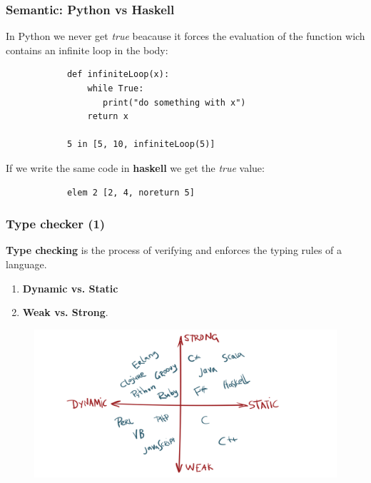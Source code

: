 \documentclass[xcolor ={table,usenames,dvipsnames}]{beamer}
\theoremstyle{definition}
\begin{document}
	\begin{frame}[fragile]
		\frametitle{Semantic: Python vs Haskell}
		In Python we never get \textit{true} beacause  it forces the evaluation of the function wich contains an infinite loop in the body:
		\begin{lstlisting}
			def infiniteLoop(x):
			    while True:
		           print("do something with x")
		        return x
				
			5 in [5, 10, infiniteLoop(5)]
		\end{lstlisting}
		If we write the same code in \textbf{haskell} we get the \textit{true} value:
		\begin{lstlisting}
			elem 2 [2, 4, noreturn 5]
		\end{lstlisting}
	\end{frame}

	\begin{frame}
		\frametitle{Type checker (1)}
			\textbf{Type checking} is the process of verifying and enforces the typing rules of a language.
		\begin{enumerate}
			\item \textbf{Dynamic vs. Static}
			\item \textbf{Weak vs. Strong}.
		\end{enumerate}
		
		\begin{figure}[h!]
			\centering
			\includegraphics[scale=0.14]{img/classification.png}
		\end{figure}
	\end{frame}
\end{document}
